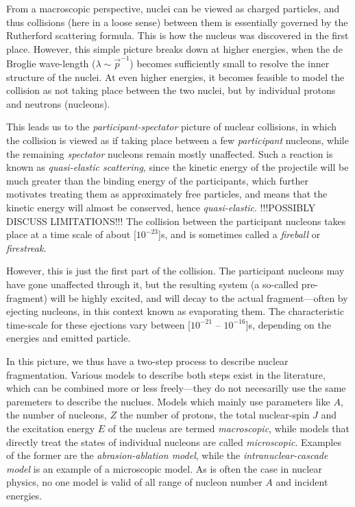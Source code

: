 From a macroscopic perspective, nuclei can be viewed as charged particles, and thus collisions (here in a loose sense) between them is essentially governed by the Rutherford scattering formula.
This is how the nucleus was discovered in the first place. However, this simple picture breaks down at higher energies, when the de Broglie wave-length ($\lambda \sim \vec{p}^{-1}$) becomes sufficiently small to resolve the inner structure of the nuclei. At even higher energies, it becomes feasible to model the collision as not taking place between the two nuclei, but by individual protons and neutrons (nucleons).

This leads us to the \emph{participant-spectator} picture of nuclear collisions, in which the collision is viewed as if taking place between a few \emph{participant} nucleons, while the remaining \emph{spectator} nucleons remain mostly unaffected. Such a reaction is known as \emph{quasi-elastic scattering}, since the kinetic energy of the projectile will be much greater than the binding energy of the participants, which further motivates treating them as approximately free particles, and means that the kinetic energy will almost be conserved, hence \emph{quasi-elastic}.
!!!POSSIBLY DISCUSS LIMITATIONS!!!
The collision between the participant nucleons takes place at a time scale of about \unit[$10^{-23}$]{s}\cite{gaimard:1991:art}, and is sometimes called a \emph{fireball} or \emph{firestreak}.

However, this is just the first part of the collision. The participant nucleons may have gone unaffected through it, but the resulting system (a so-called pre-fragment) will be highly excited, and will decay to the actual fragment---often by ejecting nucleons, in this context known as evaporating them. The characteristic time-scale for these ejections vary between \unit[$10^{-21}$ -- $10^{-16}$]{s}, depending on the energies and emitted particle\cite{gaimard:1991:art}. 

In this picture, we thus have a two-step process to describe nuclear fragmentation. 
Various models to describe both steps exist in the literature, which can be combined more or less freely---they do not necesarilly use the same paremeters to describe the nuclues. Models which mainly use parameters like $A$, the number of nucleons, $Z$ the number of protons, the total nuclear-spin $J$ and the excitation energy $E$ of the nucleus are termed \emph{macroscopic}, while models that directly treat the states of individual nucleons are called \emph{microscopic}. Examples of the former are the \emph{abrasion-ablation model}\cite{bowman:1973:book}, while the \emph{intranuclear-cascade model}\cite{metropolis:1991:art} is an example of a microscopic model. As is often the case in nuclear physics, no one model is valid of all range of nucleon number $A$ and incident energies\cite{cucinotta:1998:art}.

